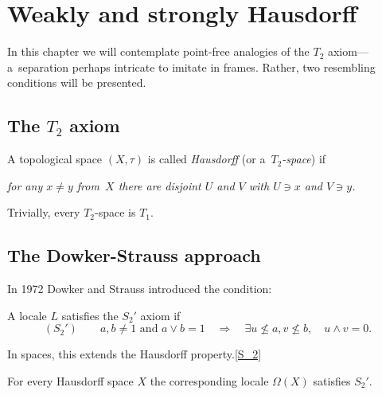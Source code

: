 \chapter{Weakly and strongly Hausdorff}

In this chapter we will contemplate point-free analogies of the $T_2$
axiom---a~separation perhaps intricate to imitate in frames.
Rather, two resembling conditions will be presented.

\section{The $T_2$ axiom}

\begin{framed}
  \begin{df}[$T_2$]
    A topological space $(X, \tau)$ is called \emph{Hausdorff\/} (or
    a~\emph{$T_2$-space\/}) if
    \begin{center} \it
      for any $x \ne y$ from~$X$ there are disjoint $U$ and $V$ with $U\owns x$
      and $V\owns y$.
    \end{center}
  \end{df}
\end{framed}

\begin{rem} \label{T2->T1}
  Trivially, every $T_2$-space is $T_1$.
\end{rem}

\section{The Dowker-Strauss approach}

In 1972 Dowker and Strauss \cite{ds72} introduced the condition:

\begin{framed}
  \begin{df}
    A locale $L$ satisfies the $S_2'$ axiom if
    \[
      (S_2') \qquad
      a, b \ne 1 \text{ and } a \vee b = 1 \quad \Rightarrow \quad \exists
      u\not\leq a, v\not\leq b, \quad u \wedge v = 0.
    \]
  \end{df}
\end{framed}

In spaces, this extends the Hausdorff property.\eqref{S_2}

\begin{prop} \label{Haus->S2'}
  For every Hausdorff space $X$ the corresponding locale $\Omega(X)$ satisfies
  $S_2'$.
\end{prop}


